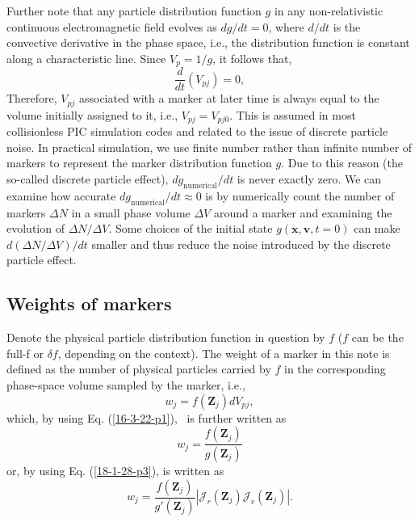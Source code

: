 \documentclass{article}
\newcommand{\tmop}[1]{\ensuremath{\operatorname{#1}}}
\begin{document}
Further note that any particle distribution function $g$ in any
non-relativistic continuous electromagnetic field evolves as $d g / d t = 0$,
where $d / d t$ is the convective derivative in the phase space, i.e., the
distribution function is constant along a characteristic line. Since $V_p = 1
/ g$, it follows that,
\begin{equation}
  \frac{d}{d t} (V_{p j}) = 0,
\end{equation}
Therefore, $V_{p j}$ associated with a marker at later time is always equal to
the volume initially assigned to it, i.e., $V_{p j} = V_{p j 0}$. This is
assumed in most collisionless PIC simulation codes and related to the issue of
discrete particle noise. In practical simulation, we use finite number rather
than infinite number of markers to represent the marker distribution function
$g$. Due to this reason (the so-called discrete particle effect), $d
g_{\tmop{numerical}} / d t$ is never exactly zero. We can examine how accurate
$d g_{\tmop{numerical}} / d t \approx 0$ is by numerically count the number of
markers $\Delta N$ in a small phase volume $\Delta V$ around a marker and
examining the evolution of $\Delta N / \Delta V$. Some choices of the initial
state $g (\mathbf{x}, \mathbf{v}, t = 0)$ can make $d (\Delta N / \Delta V) /
d t$ smaller and thus reduce the noise introduced by the discrete particle
effect.

\subsection{Weights of markers}

Denote the physical particle distribution function in question by $f$ ($f$ can
be the full-f or $\delta f$, depending on the context). The weight of a marker
in this note is defined as the number of physical particles carried by $f$ in
the corresponding phase-space volume sampled by the marker, i.e.,
\begin{equation}
  w_j = f (\mathbf{Z}_j) d V_{p j},
\end{equation}
which, by using Eq. (\ref{16-3-22-p1}), \ is further written as
\begin{equation}
  \label{18-12-15-2} w_j = \frac{f (\mathbf{Z}_j)}{g (\mathbf{Z}_j)}
\end{equation}
or, by using Eq. (\ref{18-1-28-p3}), is written as
\begin{equation}
  w_j = \frac{f (\mathbf{Z}_j)}{g' (\mathbf{Z}_j)} | \mathcal{J}_r
  (\mathbf{Z}_j) \mathcal{J}_v (\mathbf{Z}_j) | .
\end{equation}
\end{document}
